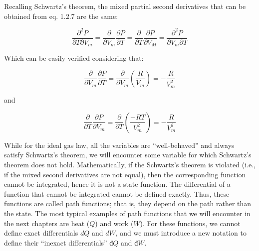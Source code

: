 \documentclass[
]{book}
\theoremstyle{definition}
\theoremstyle{definition}
\theoremstyle{definition}
\theoremstyle{remark}
\begin{document}
Recalling Schwartz's theorem, the mixed partial second derivatives that can be obtained from eq. 1.2.7 are the same:

\begin{equation}
  \frac{\partial^2 P}{\partial T \partial V_m}=\frac{\partial}{\partial V_m}\frac{\partial P}{\partial T}=\frac{\partial}{\partial T}\frac{\partial P}{\partial V_M}=\frac{\partial^2 P}{\partial V_m \partial T}
  \label{eq:schwartzP}
\end{equation}

Which can be easily verified considering that:

\begin{equation}
  \frac{\partial}{\partial V_m} \frac{\partial P}{\partial T}  = \frac{\partial}{\partial V_m} \left(\frac{R}{V_m}\right) = -\frac{R}{V_m^2} 
  \label{eq:secondderPA}
\end{equation}

and

\begin{equation}
  \frac{\partial}{\partial T} \frac{\partial P}{\partial V_m}  = \frac{\partial}{\partial T} \left(\frac{-RT}{V_m^2}\right) = -\frac{R}{V_m^2} 
  \label{eq:secondderPB}
\end{equation}

While for the ideal gas law, all the variables are ``well-behaved'' and always satisfy Schwartz's theorem, we will encounter some variable for which Schwartz's theorem does not hold. Mathematically, if the Schwartz's theorem is violated (i.e., if the mixed second derivatives are not equal), then the corresponding function cannot be integrated, hence it is not a state function. The differential of a function that cannot be integrated cannot be defined exactly. Thus, these functions are called path functions; that is, they depend on the path rather than the state. The most typical examples of path functions that we will encounter in the next chapters are heat (\(Q\)) and work (\(W\)). For these functions, we cannot define exact differentials \(dQ\) and \(dW\), and we must introduce a new notation to define their ``inexact differentials'' \(đ Q\) and \(đ W\).
\end{document}
